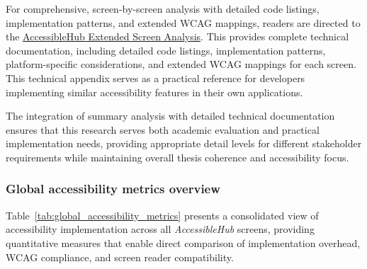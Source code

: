 For comprehensive, screen-by-screen analysis with detailed code listings, implementation patterns, and extended WCAG mappings, readers are directed to the \href{https://github.com/gabrielrovesti/AccessibleHub/blob/main/Technical\%20Thesis\%20Appendix/AccessibleHub\%20-\%20Extended\%20screen\%20analysis.pdf}{AccessibleHub Extended Screen Analysis}.
This provides complete technical documentation, including detailed code listings, implementation patterns, platform-specific considerations, and extended WCAG mappings for each screen. This technical appendix serves as a practical reference for developers implementing similar accessibility features in their own applications.

The integration of summary analysis with detailed technical documentation ensures that this research serves both academic evaluation and practical implementation needs, providing appropriate detail levels for different stakeholder requirements while maintaining overall thesis coherence and accessibility focus.

\subsubsection{Global accessibility metrics overview}
\label{subsubsec:global-metrics-overview}

Table~\ref{tab:global_accessibility_metrics} presents a consolidated view of accessibility implementation across all \textit{AccessibleHub} screens, providing quantitative measures that enable direct comparison of implementation overhead, WCAG compliance, and screen reader compatibility.

